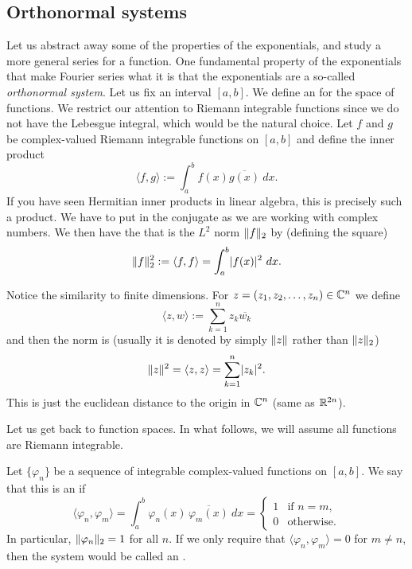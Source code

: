 \subsection{Orthonormal systems}

Let us abstract away some of the properties of the exponentials, and
study a more general series for a function.
One fundamental property of the exponentials that make Fourier series what it 
is that the exponentials are a so-called \emph{orthonormal system}.
Let us fix an interval $[a,b]$.  We define an
\emph{} for the space of functions.  We restrict our attention
to Riemann integrable functions since we do not have the Lebesgue
integral, which
would be the natural choice.  Let $f$ and $g$ be complex-valued 
Riemann integrable functions on $[a,b]$ and define the inner product
\begin{equation*}
\langle f , g \rangle :=
\int_a^b f(x) \overline{g(x)} ~ dx .
\end{equation*}
If you have seen Hermitian inner products in linear algebra, this
is precisely such a product.  We have to put in the conjugate as we are
working with complex numbers.  We then have the  that is the
$L^2$ norm $\lVert {f} \rVert_2$ by (defining the square)
\begin{equation*}
\lVert {f} \rVert_2^2 :=
\langle f , f \rangle =
\int_a^b \lvert {f(x)} \rvert^2 ~ dx .
\end{equation*}

\begin{remark}
Notice the similarity to finite dimensions.  For $z = (z_1,z_2,\ldots,z_n) \in 
{\mathbb{C}}^n$ we define 
\begin{equation*}
\langle z , w \rangle :=
\sum_{k=1}^n z_k \overline{w_k}
\end{equation*}
and then the norm is (usually it is denoted by simply $\lVert {z} \rVert$ rather than
$\lVert {z} \rVert_2$)
\begin{equation*}
\lVert {z} \rVert^2 = 
\langle z , z \rangle =
\sum_{k=1}^n \lvert {z_k} \rvert^2 .
\end{equation*}
This is just the euclidean distance to the origin in ${\mathbb{C}}^n$ (same as
${\mathbb{R}}^{2n}$).
\end{remark}

Let us get back to function spaces.  In what follows, we will
assume all functions are Riemann integrable.

\begin{defn}
Let $\{ \varphi_n \}$ be a sequence of integrable complex-valued
functions on $[a,b]$.  We say that this is an
\emph{} if
\begin{equation*}
\langle \varphi_n , \varphi_m \rangle
=
\int_a^b \varphi_n(x) \, \overline{\varphi_m(x)} ~ dx
= 
\begin{cases}
1 & \text{if } n=m, \\
0 & \text{otherwise.}
\end{cases}
\end{equation*}
In particular, $\lVert {\varphi_n} \rVert_2 = 1$ for all $n$.  If we
only require that 
$\langle \varphi_n , \varphi_m \rangle = 0$ for $m\not= n$, then
the system would be called an \emph{}.
\end{defn}

